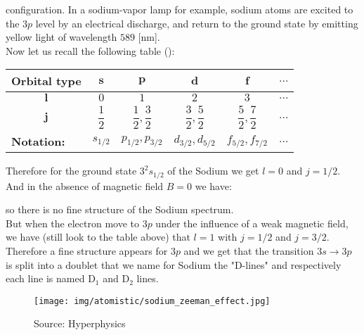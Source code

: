 	\begin{tcolorbox}[colframe=black,colback=white,sharp corners]
	
	configuration. In a sodium-vapor lamp for example, sodium atoms are excited to the $3p$ level by an electrical discharge, and return to the ground state by emitting yellow light of wavelength $589$ [nm].\\
	
	Now let us recall the following table ():
	\begin{table}[H]
		\centering
		\renewcommand{\arraystretch}{2.6}
		\begin{tabular}{|c|c|c|c|c|c|}
		\hline
		\rowcolor[HTML]{9B9B9B} 
		\textbf{Orbital type} & \textbf{$\pmb{s}$} & \textbf{$\pmb{p}$} & \textbf{$\pmb{d}$} & \textbf{$\pmb{f}$} & \textbf{$\pmb{\ldots}$} \\ \hline
		\cellcolor[HTML]{9B9B9B}\textbf{$\pmb{l}$} & $0$ & $1$ & $2$ & $3$ & $\ldots$ \\ \hline
		\cellcolor[HTML]{9B9B9B}\textbf{$\pmb{j}$} & $\dfrac{1}{2}$ & $\dfrac{1}{2},\dfrac{3}{2}$ & $\dfrac{3}{2},\dfrac{5}{2}$ & $\dfrac{5}{2},\dfrac{7}{2}$ & $\ldots$ \\ \hline
		\multicolumn{1}{|l|}{\cellcolor[HTML]{9B9B9B}\textbf{Notation:}} & $s_{1/2}$ & $p_{1/2},p_{3/2}$ & $d_{3/2},d_{5/2}$ & $f_{5/2},f_{7/2}$ & $\ldots$ \\ \hline
		\end{tabular}
	\end{table}
	Therefore for the ground state $3^2s_{1/2}$ of the Sodium we get $l=0$ and $j=1/2$. And in the absence of magnetic field $B=0$ we have:
	
	so there is no fine structure of the Sodium spectrum.\\
	
	But when the electron move to $3p$ under the influence of a weak magnetic field, we have (still look to the table above) that $l=1$ with $j=1/2$ and $j=3/2$. \\
	
	Therefore a fine structure appears for $3p$ and we get that the transition $3s\rightarrow 3p$ is split into a doublet that we name for Sodium the "D-lines" and respectively each line is named $\text{D}_1$ and $\text{D}_2$ lines. 
	\begin{figure}[H]
		\centering
		\texttt{[image: img/atomistic/sodium\_zeeman\_effect.jpg]}	
		\caption[]{Source: Hyperphysics}
	\end{figure}
	\end{tcolorbox}
	
